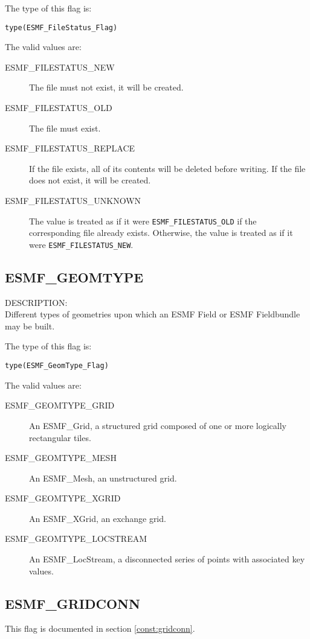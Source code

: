 The type of this flag is:

{\tt type(ESMF\_FileStatus\_Flag)}

The valid values are:
\begin{description}
\item [ESMF\_FILESTATUS\_NEW]
      The file must not exist, it will be created.
\item [ESMF\_FILESTATUS\_OLD]
      The file must exist.
\item [ESMF\_FILESTATUS\_REPLACE]
      If the file exists, all of its contents will be deleted before writing.
      If the file does not exist, it will be created.
\item [ESMF\_FILESTATUS\_UNKNOWN]
      The value is treated as if it were {\tt ESMF\_FILESTATUS\_OLD} if
      the corresponding file already exists. Otherwise, the value is
      treated as if it were {\tt ESMF\_FILESTATUS\_NEW}.

\end{description}

\subsection{ESMF\_GEOMTYPE}
\label{const:geomtype}

{\sf DESCRIPTION:\\}
 Different types of geometries upon which an ESMF Field or ESMF Fieldbundle may
be built. 

The type of this flag is:

{\tt type(ESMF\_GeomType\_Flag)}

The valid values are:
\begin{description}
\item [ESMF\_GEOMTYPE\_GRID]
      An ESMF\_Grid, a structured grid composed of one or more logically rectangular tiles.
\item [ESMF\_GEOMTYPE\_MESH]
      An ESMF\_Mesh, an unstructured grid.
\item [ESMF\_GEOMTYPE\_XGRID]
      An ESMF\_XGrid, an exchange grid.
\item [ESMF\_GEOMTYPE\_LOCSTREAM]
      An ESMF\_LocStream, a disconnected series of points with associated key values.
\end{description}

\subsection{ESMF\_GRIDCONN}
This flag is documented in section \ref{const:gridconn}.

